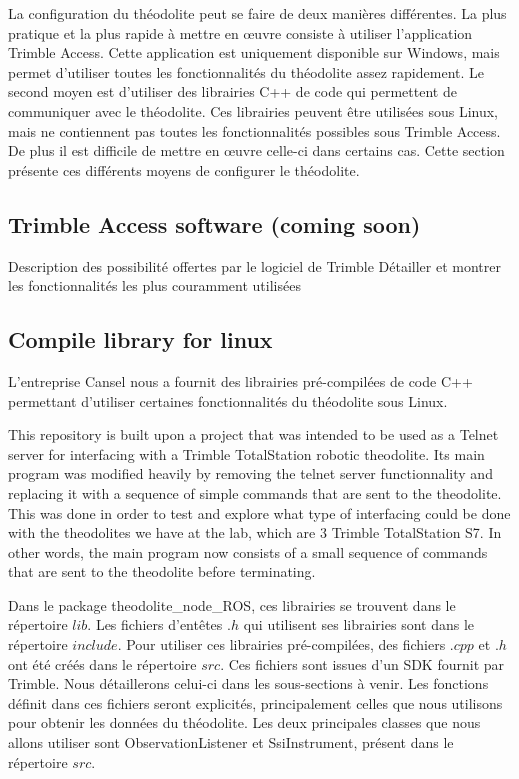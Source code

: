 \documentclass[10pt,letterpaper,oneside]{article}
\begin{document}
La configuration du théodolite peut se faire de deux manières différentes.
La plus pratique et la plus rapide à mettre en œuvre consiste à utiliser l'application Trimble Access.
Cette application est uniquement disponible sur Windows, mais permet d'utiliser toutes les fonctionnalités du théodolite assez rapidement.
Le second moyen est d'utiliser des librairies C++ de code qui permettent de communiquer avec le théodolite.
Ces librairies peuvent être utilisées sous Linux, mais ne contiennent pas toutes les fonctionnalités possibles sous Trimble Access.
De plus il est difficile de mettre en œuvre celle-ci dans certains cas.
Cette section présente ces différents moyens de configurer le théodolite.

\subsection{Trimble Access software (coming soon)}

Description des possibilité offertes par le logiciel de Trimble
Détailler et montrer les fonctionnalités les plus couramment utilisées

\subsection{Compile library for linux}

L'entreprise Cansel nous a fournit des librairies pré-compilées de code C++ permettant d'utiliser certaines fonctionnalités du théodolite sous Linux.

This repository is built upon a project that was intended to be used as a Telnet server for interfacing with a Trimble TotalStation robotic theodolite. 
Its main program was modified heavily by removing the telnet server functionnality and replacing it with a sequence of simple commands that are sent to the theodolite. 
This was done in order to test and explore what type of interfacing could be done with the theodolites we have at the lab, which are 3 Trimble TotalStation S7. 
In other words, the main program now consists of a small sequence of commands that are sent to the theodolite before terminating.

Dans le package theodolite\_node\_ROS, ces librairies se trouvent dans le répertoire $lib$.
Les fichiers d'entêtes $.h$ qui utilisent ses librairies sont dans le répertoire $include$.
Pour utiliser ces librairies pré-compilées, des fichiers $.cpp$ et $.h$ ont été créés dans le répertoire $src$.
Ces fichiers sont issues d'un SDK fournit par Trimble.
Nous détaillerons celui-ci dans les sous-sections à venir.
Les fonctions définit dans ces fichiers seront explicités, principalement celles que nous utilisons pour obtenir les données du théodolite.
Les deux principales classes que nous allons utiliser sont ObservationListener et SsiInstrument, présent dans le répertoire $src$.
\end{document}
